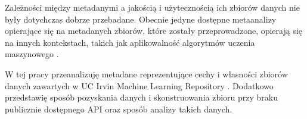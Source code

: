 Zależności między metadanymi a jakością i użytecznością ich zbiorów danych nie były dotychczas dobrze przebadane.
Obecnie jedyne dostępne metaanalizy opierające się na metadanych zbiorów, które zostały przeprowadzone, opierają się na innych kontekstach, takich jak aplikowalność algorytmów uczenia maszynowego \cite{brazdil1994characterizing}.

W tej pracy przeanalizuję metadane reprezentujące cechy i własności zbiorów danych zawartych w UC Irvin Machine Learning Repository \cite{Dua:2021}.
Dodatkowo przedstawię sposób pozyskania danych i skonstruowania zbioru przy braku publicznie dostępnego API oraz sposób analizy takich danych.
